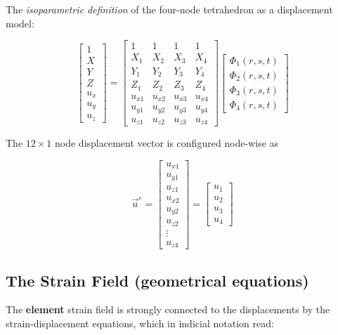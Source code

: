 The \textit{isoparametric definition} of the four-node tetrahedron as a displacement model:

\begin{equation}
\begin{bmatrix}
1\\
X\\
Y\\
Z\\
u_x\\
u_y\\
u_z
\end{bmatrix} = \begin{bmatrix}
1 & 1 & 1 & 1\\
X_1 & X_2 & X_3 & X_4\\
Y_1 & Y_2 & Y_3 & Y_4\\
Z_1 & Z_2 & Z_3 & Z_4\\
u_{x1} & u_{x2} & u_{x3} & u_{x4}\\
u_{y1} & u_{y2} & u_{y3} & u_{y4}\\
u_{z1} & u_{z2} & u_{z3} & u_{z4}
\end{bmatrix} \begin{bmatrix}
\Phi_1(r,s,t)\\
\Phi_2(r,s,t)\\
\Phi_3(r,s,t)\\
\Phi_4(r,s,t)
\end{bmatrix}
\end{equation}

The $ 12 \times 1 $ node displacement vector is configured node-wise as

\begin{equation}
\vec{u}^e = \begin{bmatrix}
u_{x1}\\
u_{y1}\\
u_{z1}\\
u_{x2}\\
u_{y2}\\
u_{z2}\\
\vdots\\
u_{z4}
\end{bmatrix} = \begin{bmatrix}
u_1\\
u_2\\
u_3\\
u_4
\end{bmatrix}
\end{equation}

\subsection{The Strain Field (geometrical equations)}
The \textbf{element} strain field is strongly connected to the displacements by the strain-displacement equations, which in indicial notation read:

